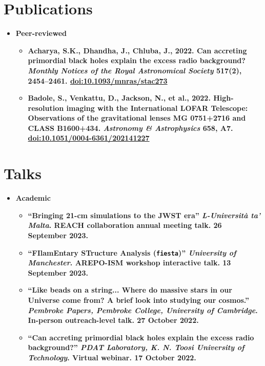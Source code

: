 \documentclass[letterpaper,11pt]{article}
\newcommand{\resumeItem}[2]{
  \item\small{
    \textbf{#1}{ #2 \vspace{-2pt}}
  }
}
\newcommand{\resumeItemListStart}{\begin{itemize}}
\newcommand{\resumeItemListEnd}{\end{itemize}\vspace{-5pt}}
\begin{document}
\section{Publications}
\begin{itemize}[leftmargin=*]
\item \textbf{Peer-reviewed} \vspace{-5pt}
\resumeItemListStart
\resumeItem
{\normalfont Acharya, S.K., Dhandha, J., Chluba, J., 2022. Can accreting primordial black holes explain the excess radio background? \textit{Monthly Notices of the Royal Astronomical Society} \textbf{517}(2), 2454–2461. \href{https://doi.org/10.1093/mnras/stac2739}{doi:10.1093/mnras/stac273}}{}
\resumeItem
{\normalfont Badole, S., Venkattu, D., Jackson, N., et al., 2022. High-resolution imaging with the International LOFAR Telescope: Observations of the gravitational lenses MG 0751+2716 and CLASS B1600+434. \textit{Astronomy \& Astrophysics} \textbf{658}, A7. \href{https://doi.org/10.1051/0004-6361/202141227}{doi:10.1051/0004-6361/202141227}}{}
\resumeItemListEnd
\end{itemize}

\section{Talks}
\begin{itemize}[leftmargin=*]
\item \textbf{Academic} \vspace{-5pt}
\resumeItemListStart
\resumeItem
{\normalfont ``Bringing 21-cm simulations to the JWST era'' \textit{L-Università ta' Malta}. REACH collaboration annual meeting talk. 26 September 2023.}{}
\resumeItem
{\normalfont ``FIlamEntary STructure Analysis (\texttt{fiesta})'' \textit{University of Manchester}. AREPO-ISM workshop interactive talk. 13 September 2023.}{}
\resumeItem
{\normalfont ``Like beads on a string... Where do massive stars in our Universe come from? A brief look into studying our cosmos.'' \textit{Pembroke Papers, Pembroke College, University of Cambridge}. In-person outreach-level talk. 27 October 2022.}{}
\resumeItem
{\normalfont ``Can accreting primordial black holes explain the excess radio background?'' \textit{PDAT Laboratory, K. N. Toosi University of Technology}. Virtual webinar. 17 October 2022.}{}
\resumeItemListEnd
\end{itemize}
\end{document}
